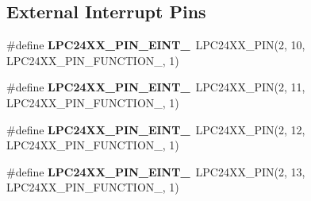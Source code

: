 \subsection*{External Interrupt Pins}
\begin{DoxyCompactItemize}
\item 
\mbox{\label{group__lpc24xx__io_ga59725025e6e5e99cef5bd7b448d053b6}} 
\#define {\bfseries L\+P\+C24\+X\+X\+\_\+\+P\+I\+N\+\_\+\+E\+I\+N\+T\+\_}~L\+P\+C24\+X\+X\+\_\+\+P\+IN(2, 10, L\+P\+C24\+X\+X\+\_\+\+P\+I\+N\+\_\+\+F\+U\+N\+C\+T\+I\+O\+N\+\_, 1)
\item 
\mbox{\label{group__lpc24xx__io_ga7e809a46c5c6d58815da1e744b997bff}} 
\#define {\bfseries L\+P\+C24\+X\+X\+\_\+\+P\+I\+N\+\_\+\+E\+I\+N\+T\+\_}~L\+P\+C24\+X\+X\+\_\+\+P\+IN(2, 11, L\+P\+C24\+X\+X\+\_\+\+P\+I\+N\+\_\+\+F\+U\+N\+C\+T\+I\+O\+N\+\_, 1)
\item 
\mbox{\label{group__lpc24xx__io_gaec45aea0282a8d222c64844a2200e375}} 
\#define {\bfseries L\+P\+C24\+X\+X\+\_\+\+P\+I\+N\+\_\+\+E\+I\+N\+T\+\_}~L\+P\+C24\+X\+X\+\_\+\+P\+IN(2, 12, L\+P\+C24\+X\+X\+\_\+\+P\+I\+N\+\_\+\+F\+U\+N\+C\+T\+I\+O\+N\+\_, 1)
\item 
\mbox{\label{group__lpc24xx__io_gad5c8c761ca05719a52648b43671e71ce}} 
\#define {\bfseries L\+P\+C24\+X\+X\+\_\+\+P\+I\+N\+\_\+\+E\+I\+N\+T\+\_}~L\+P\+C24\+X\+X\+\_\+\+P\+IN(2, 13, L\+P\+C24\+X\+X\+\_\+\+P\+I\+N\+\_\+\+F\+U\+N\+C\+T\+I\+O\+N\+\_, 1)
\end{DoxyCompactItemize}
